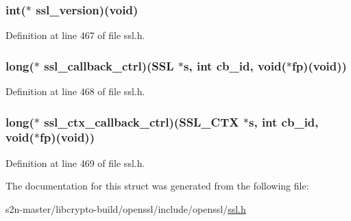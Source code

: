 \subsubsection[{\texorpdfstring{ssl\+\_\+version}{ssl_version}}]{\setlength{\rightskip}{0pt plus 5cm}int($\ast$ ssl\+\_\+version)({\bf void})}\hypertarget{structssl__method__st_ac1006c82a4a9ab66dd41a14ab6672d87}{}\label{structssl__method__st_ac1006c82a4a9ab66dd41a14ab6672d87}


Definition at line 467 of file ssl.\+h.

\subsubsection[{\texorpdfstring{ssl\+\_\+callback\+\_\+ctrl}{ssl_callback_ctrl}}]{\setlength{\rightskip}{0pt plus 5cm}long($\ast$ ssl\+\_\+callback\+\_\+ctrl)({\bf S\+SL} $\ast$s, int cb\+\_\+id, {\bf void}($\ast${\bf fp})({\bf void}))}\hypertarget{structssl__method__st_aa24a0c83d83ae1af7dcf9af476b22927}{}\label{structssl__method__st_aa24a0c83d83ae1af7dcf9af476b22927}


Definition at line 468 of file ssl.\+h.

\subsubsection[{\texorpdfstring{ssl\+\_\+ctx\+\_\+callback\+\_\+ctrl}{ssl_ctx_callback_ctrl}}]{\setlength{\rightskip}{0pt plus 5cm}long($\ast$ ssl\+\_\+ctx\+\_\+callback\+\_\+ctrl)({\bf S\+S\+L\+\_\+\+C\+TX} $\ast$s, int cb\+\_\+id, {\bf void}($\ast${\bf fp})({\bf void}))}\hypertarget{structssl__method__st_afb4acab11f788cc0abd0b1b19cb7e98a}{}\label{structssl__method__st_afb4acab11f788cc0abd0b1b19cb7e98a}


Definition at line 469 of file ssl.\+h.



The documentation for this struct was generated from the following file\+:\begin{DoxyCompactItemize}
\item 
s2n-\/master/libcrypto-\/build/openssl/include/openssl/\hyperlink{include_2openssl_2ssl_8h}{ssl.\+h}\end{DoxyCompactItemize}
